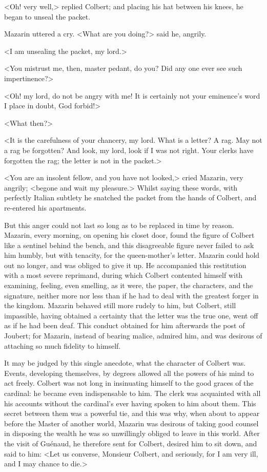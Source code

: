 <Oh! very well,> replied Colbert; and placing his hat between his knees, he began to unseal the packet.

Mazarin uttered a cry. <What are you doing?> said he, angrily.

<I am unsealing the packet, my lord.>

<You mistrust me, then, master pedant, do you? Did any one ever see such impertinence?>

<Oh! my lord, do not be angry with me! It is certainly not your eminence's word I place in doubt, God forbid!>

<What then?>

<It is the carefulness of your chancery, my lord. What is a letter? A rag. May not a rag be forgotten? And look, my lord, look if I was not right. Your clerks have forgotten the rag; the letter is not in the packet.>

<You are an insolent fellow, and you have not looked,> cried Mazarin, very angrily; <begone and wait my pleasure.> Whilst saying these words, with perfectly Italian subtlety he snatched the packet from the hands of Colbert, and re-entered his apartments.

But this anger could not last so long as to be replaced in time by reason. Mazarin, every morning, on opening his closet door, found the figure of Colbert like a sentinel behind the bench, and this disagreeable figure never failed to ask him humbly, but with tenacity, for the queen-mother's letter. Mazarin could hold out no longer, and was obliged to give it up. He accompanied this restitution with a most severe reprimand, during which Colbert contented himself with examining, feeling, even smelling, as it were, the paper, the characters, and the signature, neither more nor less than if he had to deal with the greatest forger in the kingdom. Mazarin behaved still more rudely to him, but Colbert, still impassible, having obtained a certainty that the letter was the true one, went off as if he had been deaf. This conduct obtained for him afterwards the post of Joubert; for Mazarin, instead of bearing malice, admired him, and was desirous of attaching so much fidelity to himself.

It may be judged by this single anecdote, what the character of Colbert was. Events, developing themselves, by degrees allowed all the powers of his mind to act freely. Colbert was not long in insinuating himself to the good graces of the cardinal: he became even indispensable to him. The clerk was acquainted with all his accounts without the cardinal's ever having spoken to him about them. This secret between them was a powerful tie, and this was why, when about to appear before the Master of another world, Mazarin was desirous of taking good counsel in disposing the wealth he was so unwillingly obliged to leave in this world. After the visit of Guénaud, he therefore sent for Colbert, desired him to sit down, and said to him: <Let us converse, Monsieur Colbert, and seriously, for I am very ill, and I may chance to die.>

